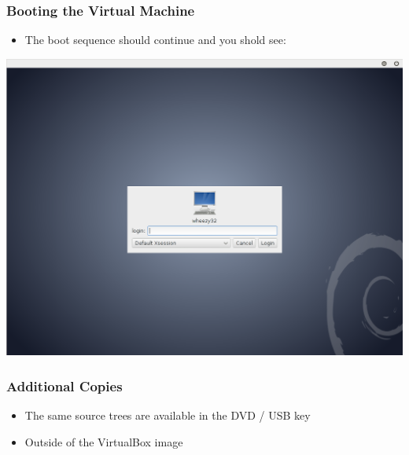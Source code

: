 \begin{frame}
\frametitle{Booting the Virtual Machine}
\begin{itemize}
\item The boot sequence should continue and you shold see:
\end{itemize}
\begin{center}
  \includegraphics[width=0.7\paperwidth]{../Art/Screenshot-ITKv4-VirtualBox-01.png}
\end{center}
\end{frame}


\begin{frame}
\frametitle{Additional Copies}
\begin{itemize}
\item The same source trees are available in the DVD / USB key
\item Outside of the VirtualBox image
\end{itemize}
\end{frame}

